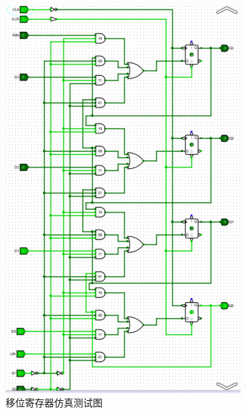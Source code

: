 \documentclass{article}
\begin{document}
    \begin{figure}[H]
    \centering
    \includegraphics[width=0.8\textwidth]{3.5.2.png}
    \caption{移位寄存器仿真测试图}
    \end{figure}
    
\end{document}
